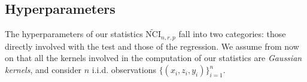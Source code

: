 










\subsection{Hyperparameters}
The hyperparameters of our statistics $\widetilde{\text{NCI}}_{n,r,p}$ fall into two categories: those directly involved with the test and those of the regression. We assume from now on that all the kernels involved in the computation of our statistics are \emph{Gaussian kernels}, and consider $n$ i.i.d. observations $\{(x_i,z_i,y_i)\}_{i=1}^n$.

